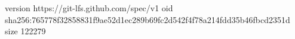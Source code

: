 version https://git-lfs.github.com/spec/v1
oid sha256:765778f32858831f9ae52d1ec289b69fc2d542f4f78a214fdd35b46fbcd2351d
size 122279
